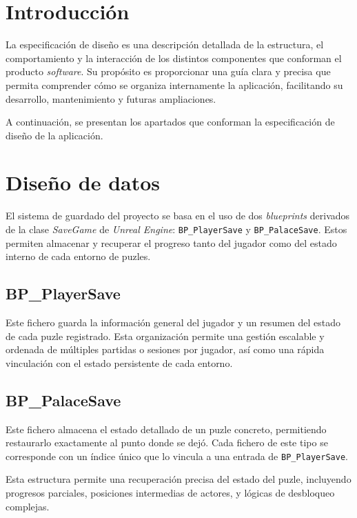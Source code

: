 
\section{Introducción}
La especificación de diseño es una descripción detallada de la estructura, el comportamiento y la interacción de los distintos componentes que conforman el producto \textit{software}. Su propósito es proporcionar una guía clara y precisa que permita comprender cómo se organiza internamente la aplicación, facilitando su desarrollo, mantenimiento y futuras ampliaciones.

A continuación, se presentan los apartados que conforman la especificación de diseño de la aplicación.

\section{Diseño de datos}

El sistema de guardado del proyecto se basa en el uso de dos \textit{blueprints} derivados de la clase \textit{SaveGame} de \textit{Unreal Engine}: \texttt{BP\_PlayerSave} y \texttt{BP\_PalaceSave}. Estos permiten almacenar y recuperar el progreso tanto del jugador como del estado interno de cada entorno de puzles.

\subsection*{BP\_PlayerSave}

Este fichero guarda la información general del jugador y un resumen del estado de cada puzle registrado. Esta organización permite una gestión escalable y ordenada de múltiples partidas o sesiones por jugador, así como una rápida vinculación con el estado persistente de cada entorno.

\subsection*{BP\_PalaceSave}

Este fichero almacena el estado detallado de un puzle concreto, permitiendo restaurarlo exactamente al punto donde se dejó. Cada fichero de este tipo se corresponde con un índice único que lo vincula a una entrada de \texttt{BP\_PlayerSave}.

Esta estructura permite una recuperación precisa del estado del puzle, incluyendo progresos parciales, posiciones intermedias de actores, y lógicas de desbloqueo complejas.

